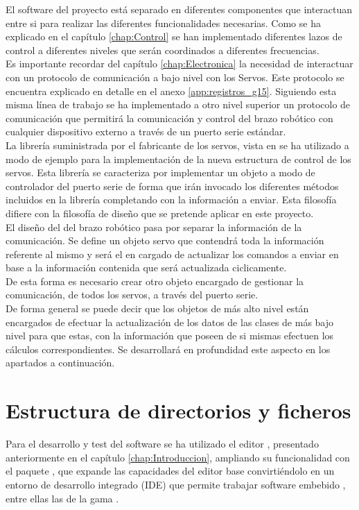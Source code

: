 El software del proyecto está separado en diferentes componentes que interactuan entre si para realizar las diferentes funcionalidades necesarias. Como se ha explicado en el capítulo \ref{chap:Control} se han implementado diferentes lazos de control a diferentes niveles que serán coordinados a diferentes frecuencias.
\\
Es importante recordar del capítulo \ref{chap:Electronica} la necesidad de interactuar con un protocolo de comunicación a bajo nivel con los Servos. Este protocolo se encuentra explicado en detalle en el anexo \ref{app:registros_g15}. Siguiendo esta misma línea de trabajo se ha implementado a otro nivel superior un protocolo de comunicación que permitirá la comunicación y control del brazo robótico con cualquier dispositivo externo a través de un puerto serie estándar.
\\
La librería suministrada por el fabricante de los servos, vista en \cite{} \completar se ha utilizado a modo de ejemplo para la implementación de la nueva estructura de control de los servos. Esta librería se caracteriza por implementar un objeto a modo de controlador del puerto serie de forma que irán invocado los diferentes métodos incluidos en la librería completando con la información a enviar. Esta filosofía difiere con la filosofía de diseño que se pretende aplicar en este proyecto.
\\
El diseño del  del brazo robótico pasa por separar la información de la comunicación. Se define un objeto servo que contendrá toda la información referente al mismo y será el en cargado de actualizar los comandos a enviar en base a la información contenida que será actualizada ciclicamente.
\\
De esta forma es necesario crear otro objeto encargado de gestionar la comunicación, de todos los servos, a través del puerto serie.
\\
De forma general se puede decir que los objetos de más alto nivel están encargados de efectuar la actualización de los datos de las clases de más bajo nivel para que estas, con la información que poseen de si mismas efectuen los cálculos correspondientes. Se desarrollará en profundidad este aspecto en los apartados a continuación.

\section{Estructura de directorios y ficheros} \label{sec:SW:estructura_dir}

Para el desarrollo y test del software se ha utilizado el editor , presentado anteriormente en el capítulo \ref{chap:Introduccion}, ampliando su funcionalidad con el paquete , que expande las capacidades del editor base convirtiéndolo en un entorno de desarrollo integrado (IDE) que permite trabajar software embebido , entre ellas las de la gama .
\\

